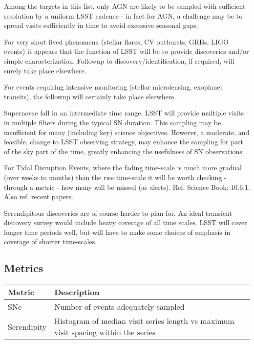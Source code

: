 Among the targets in this list, only AGN are likely to be sampled with sufficient resolution by a uniform LSST cadence - in fact for AGN, a challenge may be to spread visits sufficiently in time to avoid excessive seasonal gaps.

For very short lived phenomena (stellar flares, CV outbursts, GRBs, LIGO events) it appears that the function of LSST will be to provide discoveries and/or simple characterization.  Followup to discovery/identification, if required, will surely take place elsewhere.

For events requiring intensive monitoring (stellar microlensing, exoplanet transits), the followup will certainly take place elsewhere.

Supernovae fall in an intermediate time range.  LSST will provide multiple visits in multiple filters during the typical SN duration.  This sampling may be insufficient for many (including key) science objectives.  However, a moderate, and feasible, change to LSST observing strategy, may enhance the sampling for part of the sky part of the time, greatly enhancing the usefulness of SN observations.

For Tidal Disruption Events, where the fading time-scale is much more gradual (over weeks to months) than the rise time-scale it will be worth checking - through a metric - how many will be missed (as alerts). Ref. Science Book: 10.6.1. Also ref. recent papers.

Serendipitous discoveries are of course harder to plan for.  An ideal transient discovery survey would include heavy coverage of all time scales. LSST will cover longer time periods well, but will have to make some choices of emphasis in coverage of shorter time-scales.




\subsection{Metrics}
\label{sec:\secname:metrics}

\begin{center}
\begin{tabular}{| p{5cm} |p{10cm} |}
\hline Metric & Description\\
\hline
SNe & Number of events adequately sampled\\
Serendipity & Histogram of median visit series length vs maximum visit spacing within the series\\
  \hline \end{tabular}
 \end{center}

